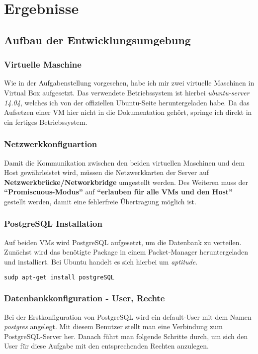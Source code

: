 
\section{Ergebnisse}
\label{sec:Ergebnisse}

\subsection{Aufbau der Entwicklungsumgebung}

\subsubsection{Virtuelle Maschine}

Wie in der Aufgabenstellung vorgesehen, habe ich mir zwei virtuelle Maschinen in Virtual Box aufgesetzt. Das verwendete Betriebssystem ist hierbei \textit{ubuntu-server 14.04}, welches ich von der offiziellen Ubuntu-Seite heruntergeladen habe.
Da das Aufsetzen einer VM hier nicht in die Dokumentation gehört, springe ich direkt in ein fertiges Betriebssystem.

\subsubsection{Netzwerkkonfiguartion}

Damit die Kommunikation zwischen den beiden virtuellen Maschinen und dem Host gewährleistet wird, müssen die Netzwerkkarten der Server auf \textbf{Netzwerkbrücke/Networkbridge} umgestellt werden. Des Weiteren muss der \textbf{``Promiscuous-Modus''} auf \textbf{``erlauben für alle VMs und den Host''} gestellt werden, damit eine fehlerfreie Übertragung möglich ist.

\subsubsection{PostgreSQL Installation}
Auf beiden VMs wird PostgreSQL aufgesetzt, um die Datenbank zu verteilen. Zunächst wird das benötigte Package in einem Packet-Manager heruntergeladen und installiert. Bei Ubuntu handelt es sich hierbei um \textit{aptitude}.
\begin{lstlisting}[language=bash,caption={PostgreSQL Installation}]
sudp apt-get install postgreSQL
\end{lstlisting}

\subsubsection{Datenbankkonfiguration - User, Rechte}
Bei der Erstkonfiguration von PostgreSQL wird ein default-User mit dem Namen \textit{postgres} angelegt. Mit diesem Benutzer stellt man eine Verbindung zum PostgreSQL-Server her. Danach führt man folgende Schritte durch, um sich den User für diese Aufgabe mit den entsprechenden Rechten anzulegen.

